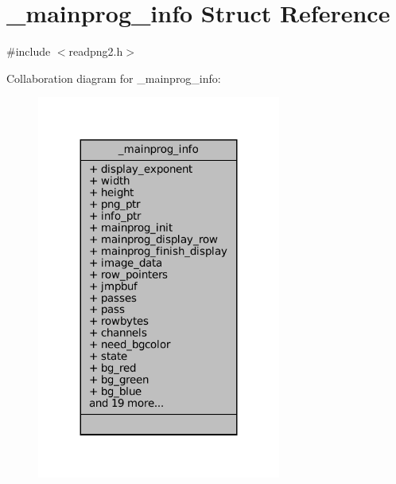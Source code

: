 \hypertarget{struct__mainprog__info}{}\section{\+\_\+mainprog\+\_\+info Struct Reference}
\label{struct__mainprog__info}


{\ttfamily \#include $<$readpng2.\+h$>$}



Collaboration diagram for \+\_\+mainprog\+\_\+info\+:
\nopagebreak
\begin{figure}[H]
\begin{center}
\leavevmode
\includegraphics[width=227pt]{struct__mainprog__info__coll__graph}
\end{center}
\end{figure}
